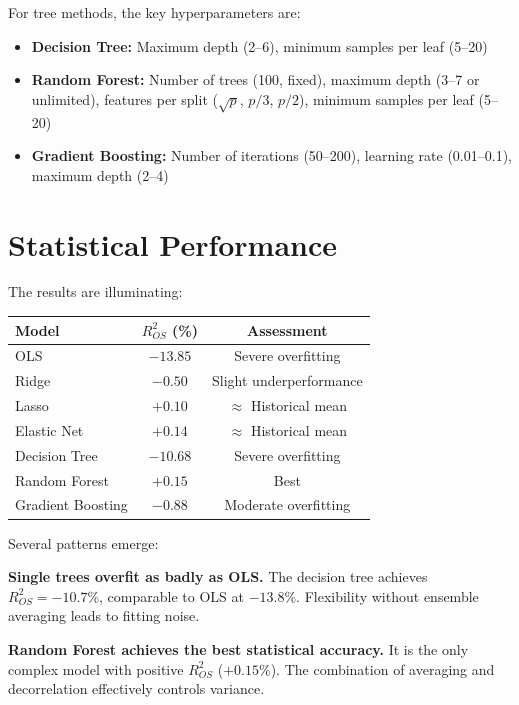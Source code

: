 \documentclass[11pt,a4paper]{article}
\begin{document}
For tree methods, the key hyperparameters are:
\begin{itemize}
    \item \textbf{Decision Tree:} Maximum depth (2--6), minimum samples per leaf (5--20)
    \item \textbf{Random Forest:} Number of trees (100, fixed), maximum depth (3--7 or unlimited), features per split ($\sqrt{p}$, $p/3$, $p/2$), minimum samples per leaf (5--20)
    \item \textbf{Gradient Boosting:} Number of iterations (50--200), learning rate (0.01--0.1), maximum depth (2--4)
\end{itemize}

\section{Statistical Performance}
The results are illuminating:

\begin{center}
\begin{tabular}{lcc}
\toprule
\textbf{Model} & \textbf{$R^2_{OS}$ (\%)} & \textbf{Assessment} \\
\midrule
OLS & $-13.85$ & Severe overfitting \\
Ridge & $-0.50$ & Slight underperformance \\
Lasso & $+0.10$ & $\approx$ Historical mean \\
Elastic Net & $+0.14$ & $\approx$ Historical mean \\
\midrule
Decision Tree & $-10.68$ & Severe overfitting \\
Random Forest & $\mathbf{+0.15}$ & Best \\
Gradient Boosting & $-0.88$ & Moderate overfitting \\
\bottomrule
\end{tabular}
\end{center}

Several patterns emerge:

\textbf{Single trees overfit as badly as OLS.} The decision tree achieves $R^2_{OS} = -10.7\%$, comparable to OLS at $-13.8\%$. Flexibility without ensemble averaging leads to fitting noise.

\textbf{Random Forest achieves the best statistical accuracy.} It is the only complex model with positive $R^2_{OS}$ ($+0.15\%$). The combination of averaging and decorrelation effectively controls variance.
\end{document}
